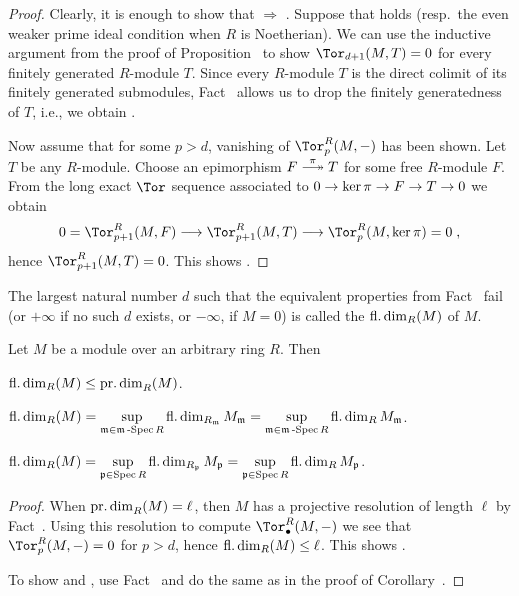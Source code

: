 \documentclass[a4paper,parskip=half,numbers=enddot, DIV=12]{scrreprt}
\begin{document}
\begin{proof}
	Clearly, it is enough to show that  $\Rightarrow$ . Suppose that  holds (resp.\ the even weaker prime ideal condition when $R$ is Noetherian). We can use the inductive argument from the proof of Proposition~ to show $\Tor_{d+1}(M,T)=0$ for every finitely generated $R$-module $T$. Since every $R$-module $T$ is the direct colimit of its finitely generated submodules, Fact~ allows us to drop the finitely generatedness of $T$, i.e., we obtain .
	
	Now assume that for some $p>d$, vanishing of $\Tor_p^R(M,-)$ has been shown. Let $T$ be any $R$-module. Choose an epimorphism $F\epimorphism[\pi]T$ for some free $R$-module $F$. From the long exact $\Tor$ sequence associated to $0\morphism \ker\pi\morphism F\morphism T\morphism 0$ we obtain
	\begin{align*}
		0=\Tor_{p+1}^R(M,F)\morphism\Tor_{p+1}^R(M,T)\morphism\Tor_p^R(M,\ker \pi)=0\;,
	\end{align*}
	hence $\Tor_{p+1}^R(M,T)=0$. This shows .
\end{proof}
\begin{defi}
	The largest natural number $d$ such that the equivalent properties from Fact~ fail (or $+\infty$ if no such $d$ exists, or $-\infty$, if $M=0$) is called the  $\operatorname{fl.dim}_R(M)$ of $M$.
\end{defi}
\begin{fact}
	Let $M$ be a module over an arbitrary ring $R$. Then
	\begin{alphanumerate}
		\item $\operatorname{fl.dim}_R(M)\leq \operatorname{pr.dim}_R(M)$.
		\item $\operatorname{fl.dim}_R(M)=\sup\limits_{\mathfrak{m}\in\mathfrak{m}\operatorname{-Spec} R}\operatorname{fl.dim}_{R_{\mathfrak{m}}}M_{\mathfrak{m}}=\sup\limits_{\mathfrak{m}\in\mathfrak{m}\operatorname{-Spec} R}\operatorname{fl.dim}_RM_{\mathfrak{m}}$.
		\item $\operatorname{fl.dim}_R(M)=\sup\limits_{\mathfrak{p}\in\operatorname{Spec} R}\operatorname{fl.dim}_{R_{\mathfrak{p}}}M_{\mathfrak{p}}=\sup\limits_{\mathfrak{p}\in\operatorname{Spec} R}\operatorname{fl.dim}_RM_{\mathfrak{p}}$.
	\end{alphanumerate}
\end{fact}
\begin{proof}
	When $\operatorname{pr.dim}_R(M)=\ell$, then $M$ has a projective resolution of length $\ell$ by Fact~. Using this resolution to compute $\Tor_\bullet^R(M,-)$ we see that $\Tor_p^R(M,-)=0$ for $p>d$, hence $\operatorname{fl.dim}_R(M)\leq \ell$. This shows .
	
	To show  and , use Fact~ and do the same as in the proof of Corollary~.
\end{proof}
\end{document}
